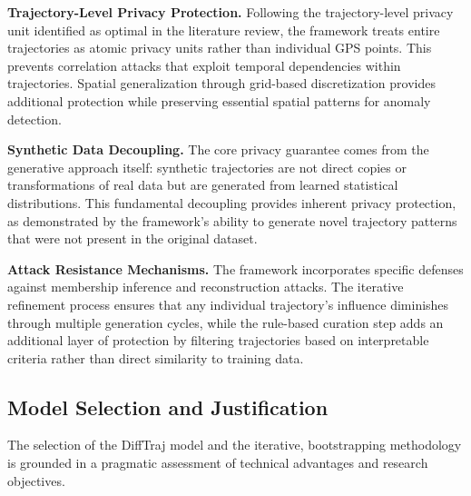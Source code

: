 \textbf{Trajectory-Level Privacy Protection.} Following the trajectory-level privacy unit identified as optimal in the literature review, the framework treats entire trajectories as atomic privacy units rather than individual GPS points. This prevents correlation attacks that exploit temporal dependencies within trajectories. Spatial generalization through grid-based discretization provides additional protection while preserving essential spatial patterns for anomaly detection.

\textbf{Synthetic Data Decoupling.} The core privacy guarantee comes from the generative approach itself: synthetic trajectories are not direct copies or transformations of real data but are generated from learned statistical distributions. This fundamental decoupling provides inherent privacy protection, as demonstrated by the framework's ability to generate novel trajectory patterns that were not present in the original dataset.

\textbf{Attack Resistance Mechanisms.} The framework incorporates specific defenses against membership inference and reconstruction attacks. The iterative refinement process ensures that any individual trajectory's influence diminishes through multiple generation cycles, while the rule-based curation step adds an additional layer of protection by filtering trajectories based on interpretable criteria rather than direct similarity to training data.

\subsection{Model Selection and Justification}
\label{sec:model-selection}

The selection of the DiffTraj model and the iterative, bootstrapping methodology is grounded in a pragmatic assessment of technical advantages and research objectives.

